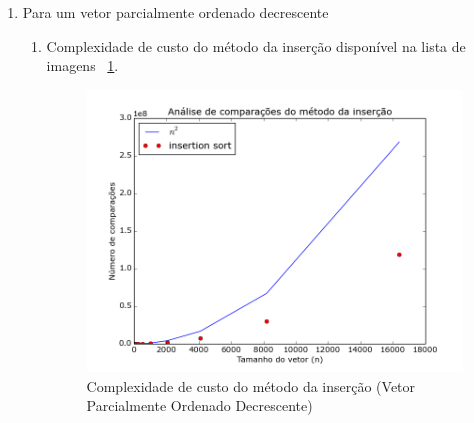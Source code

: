\documentclass[12pt,a4paper,twoside]{report}
\begin{document}
\begin{enumerate}
\begin{enumerate}
							\end{enumerate}


			\item Para um vetor parcialmente ordenado decrescente
										\begin{enumerate}
											\item Complexidade de custo do método da inserção disponível na lista de imagens ~\ref{fig:InsertionPlot1POD}.
											\begin{figure}[!h]
												\centering
												\includegraphics[scale=0.6]{../imagens/Insertion/insertion_plot_1_parcialmente_ordenado_decrescente.png}
												\caption{Complexidade de custo do método da inserção (Vetor Parcialmente Ordenado Decrescente) \label{fig:InsertionPlot1POD}}
											\end{figure}



\end{enumerate}
\end{enumerate}
\end{document}
